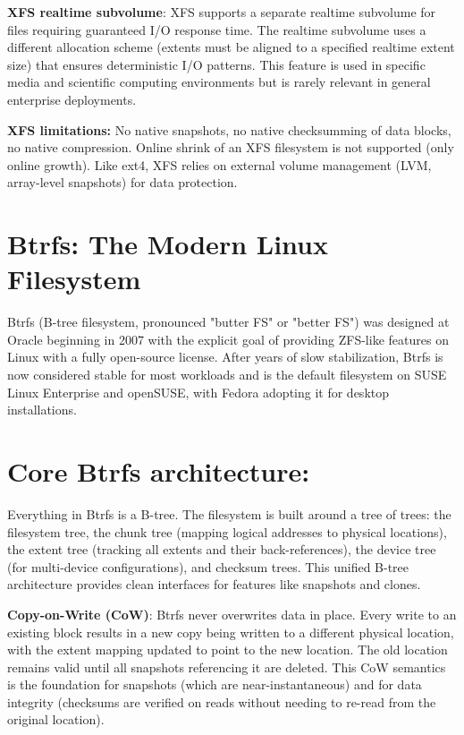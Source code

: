 \textbf{XFS realtime subvolume}: XFS supports a separate realtime subvolume for files requiring guaranteed I/O response time. The realtime subvolume uses a different allocation scheme (extents must be aligned to a specified realtime extent size) that ensures deterministic I/O patterns. This feature is used in specific media and scientific computing environments but is rarely relevant in general enterprise deployments.

\textbf{XFS limitations:} No native snapshots, no native checksumming of data blocks, no native compression. Online shrink of an XFS filesystem is not supported (only online growth). Like ext4, XFS relies on external volume management (LVM, array-level snapshots) for data protection.

\section{Btrfs: The Modern Linux Filesystem}
Btrfs (B-tree filesystem, pronounced "butter FS" or "better FS") was designed at Oracle beginning in 2007 with the explicit goal of providing ZFS-like features on Linux with a fully open-source license. After years of slow stabilization, Btrfs is now considered stable for most workloads and is the default filesystem on SUSE Linux Enterprise and openSUSE, with Fedora adopting it for desktop installations.

\section{Core Btrfs architecture:}
Everything in Btrfs is a B-tree. The filesystem is built around a tree of trees: the filesystem tree, the chunk tree (mapping logical addresses to physical locations), the extent tree (tracking all extents and their back-references), the device tree (for multi-device configurations), and checksum trees. This unified B-tree architecture provides clean interfaces for features like snapshots and clones.

\textbf{Copy-on-Write (CoW)}: Btrfs never overwrites data in place. Every write to an existing block results in a new copy being written to a different physical location, with the extent mapping updated to point to the new location. The old location remains valid until all snapshots referencing it are deleted. This CoW semantics is the foundation for snapshots (which are near-instantaneous) and for data integrity (checksums are verified on reads without needing to re-read from the original location).

